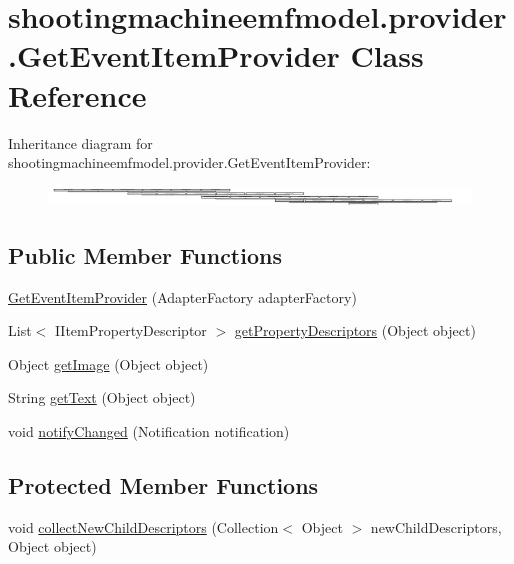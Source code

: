 \hypertarget{classshootingmachineemfmodel_1_1provider_1_1_get_event_item_provider}{\section{shootingmachineemfmodel.\-provider.\-Get\-Event\-Item\-Provider Class Reference}
\label{classshootingmachineemfmodel_1_1provider_1_1_get_event_item_provider}
}
Inheritance diagram for shootingmachineemfmodel.\-provider.\-Get\-Event\-Item\-Provider\-:\begin{figure}[H]
\begin{center}
\leavevmode
\includegraphics[height=0.534759cm]{classshootingmachineemfmodel_1_1provider_1_1_get_event_item_provider}
\end{center}
\end{figure}
\subsection*{Public Member Functions}
\begin{DoxyCompactItemize}
\item 
\hyperlink{classshootingmachineemfmodel_1_1provider_1_1_get_event_item_provider_a3999677a22accabf68e5d1822860c54f}{Get\-Event\-Item\-Provider} (Adapter\-Factory adapter\-Factory)
\item 
List$<$ I\-Item\-Property\-Descriptor $>$ \hyperlink{classshootingmachineemfmodel_1_1provider_1_1_get_event_item_provider_af354bb680d30d9cdb2f1a737b47895b7}{get\-Property\-Descriptors} (Object object)
\item 
Object \hyperlink{classshootingmachineemfmodel_1_1provider_1_1_get_event_item_provider_aac9cdea8b08567582d901d37131d54f4}{get\-Image} (Object object)
\item 
String \hyperlink{classshootingmachineemfmodel_1_1provider_1_1_get_event_item_provider_a3841117ef2e0cf0c1d38977534525405}{get\-Text} (Object object)
\item 
void \hyperlink{classshootingmachineemfmodel_1_1provider_1_1_get_event_item_provider_a1284d628acbd26e7f08a41ea4824cd7d}{notify\-Changed} (Notification notification)
\end{DoxyCompactItemize}
\subsection*{Protected Member Functions}
\begin{DoxyCompactItemize}
\item 
void \hyperlink{classshootingmachineemfmodel_1_1provider_1_1_get_event_item_provider_ae7df5cb7bc38fdf278a468790805ecb3}{collect\-New\-Child\-Descriptors} (Collection$<$ Object $>$ new\-Child\-Descriptors, Object object)
\end{DoxyCompactItemize}


